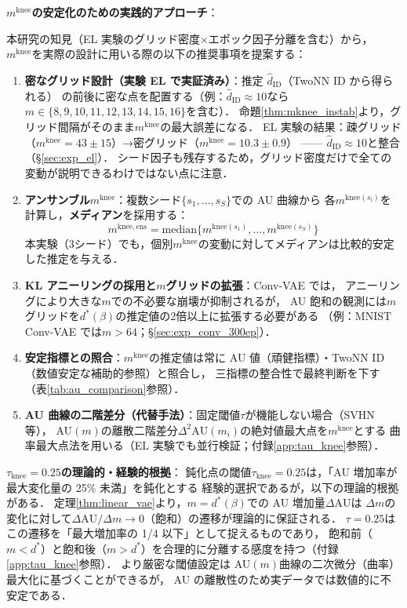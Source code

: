 \documentclass[11pt,a4paper]{jsarticle}
\newcommand{\mknee}{m^{\mathrm{knee}}}
\begin{document}
\textbf{$\mknee$の安定化のための実践的アプローチ}：

本研究の知見（EL 実験のグリッド密度×エポック因子分離を含む）から，
$\mknee$を実際の設計に用いる際の以下の推奨事項を提案する：
\begin{enumerate}
  \item \textbf{密なグリッド設計（実験 EL で実証済み）}：推定 $\hat{d}_\mathrm{ID}$（TwoNN ID から得られる）
        の前後に密な点を配置する（例：$\hat{d}_\mathrm{ID} \approx 10$なら$m \in \{8,9,10,11,12,13,14,15,16\}$を含む）．
        命題\ref{thm:mknee_instab}より，グリッド間隔がそのまま$\mknee$の最大誤差になる．
        EL 実験の結果：疎グリッド（$\mknee=43\pm15$）→密グリッド（$\mknee=10.3\pm0.9$）
        —— $\hat{d}_\mathrm{ID} \approx 10$と整合（§\ref{sec:exp_el}）．
        シード因子も残存するため，グリッド密度だけで全ての変動が説明できるわけではない点に注意．
  \item \textbf{アンサンブル$\mknee$}：複数シード$\{s_1,\ldots,s_S\}$での AU 曲線から
        各$m^{\mathrm{knee}(s_i)}$を計算し，\textbf{メディアン}を採用する：
        \begin{equation}
          m^{\mathrm{knee,ens}} = \mathrm{median}\bigl\{m^{\mathrm{knee}(s_1)}, \ldots, m^{\mathrm{knee}(s_S)}\bigr\}
          \label{eq:mknee_ens}
        \end{equation}
        本実験（3シード）でも，個別$\mknee$の変動に対してメディアンは比較的安定した推定を与える．
  \item \textbf{KL アニーリングの採用と$m$グリッドの拡張}：Conv-VAE では，
        アニーリングにより大きな$m$での不必要な崩壊が抑制されるが，
        AU 飽和の観測には$m$グリッドを$d^*(\beta)$の推定値の2倍以上に拡張する必要がある
        （例：MNIST Conv-VAE では$m > 64$；§\ref{sec:exp_conv_300ep}）．
  \item \textbf{安定指標との照合}：$\mknee$の推定値は常に AU 値（頑健指標）・TwoNN ID（数値安定な補助的参照）と照合し，
        三指標の整合性で最終判断を下す（表\ref{tab:au_comparison}参照）．
  \item \textbf{AU 曲線の二階差分（代替手法）}：固定閾値$\tau$が機能しない場合（SVHN 等），
        AU$(m)$の離散二階差分$\Delta^2\mathrm{AU}(m_i)$の絶対値最大点を$\mknee$とする
        曲率最大点法を用いる（EL 実験でも並行検証；付録\ref{app:tau_knee}参照）．
\end{enumerate}

\textbf{$\tau_{\mathrm{knee}} = 0.25$の理論的・経験的根拠}：
鈍化点の閾値$\tau_{\mathrm{knee}} = 0.25$は，「AU 増加率が最大変化量の 25\% 未満」を鈍化とする
経験的選択であるが，以下の理論的根拠がある．
定理\ref{thm:linear_vae}より，$m = d^*(\beta)$での AU 増加量$\Delta\mathrm{AU}$は
$\Delta m$の変化に対して$\Delta\mathrm{AU}/\Delta m \to 0$（飽和）の遷移が理論的に保証される．
$\tau = 0.25$はこの遷移を「最大増加率の 1/4 以下」として捉えるものであり，
飽和前（$m < d^*$）と飽和後（$m > d^*$）を合理的に分離する感度を持つ（付録\ref{app:tau_knee}参照）．
より厳密な閾値設定は AU$(m)$曲線の二次微分（曲率）最大化に基づくことができるが，
AU の離散性のため実データでは数値的に不安定である．
\end{document}
